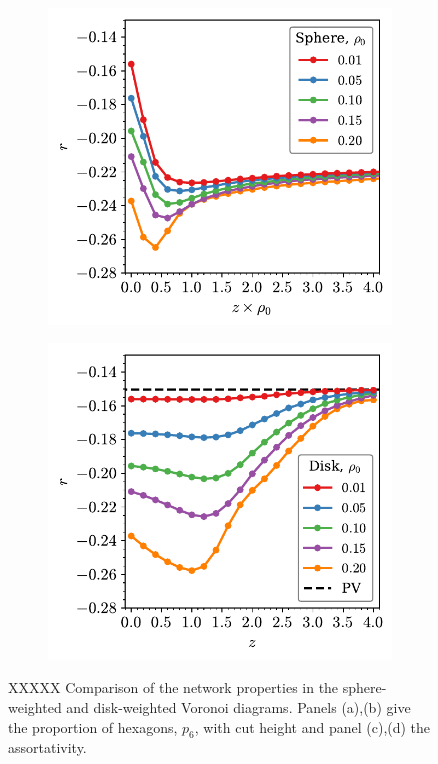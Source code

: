 \begin{figure}
     \begin{subfigure}[b]{0.48\textwidth}
         \centering
         \includegraphics[width=\textwidth]{./figures/quasi2d/r_z_3d_sphere.pdf}
         \caption{}
         \label{fig:nphic}
     \end{subfigure}
     \hfill
      \begin{subfigure}[b]{0.48\textwidth}
         \centering
         \includegraphics[width=\textwidth]{./figures/quasi2d/r_z_3d_disk.pdf}
         \caption{}
         \label{fig:nphid}
     \end{subfigure}
     \hfill
     
	\caption{XXXXX Comparison of the network properties in the sphere\--weighted and disk\--weighted Voronoi diagrams.
	Panels (a),(b) give the proportion of hexagons, $p_6$, with cut height and panel (c),(d) the assortativity.}
	\label{fig:pr}
\end{figure}


